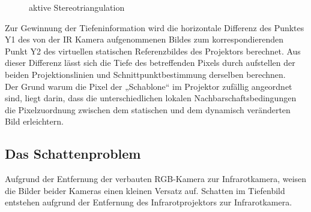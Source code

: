 \begin{figure}[!ht]
  \centering
   \caption{ aktive Stereotriangulation }
\end{figure}
Zur Gewinnung der Tiefeninformation wird die horizontale Differenz des Punktes Y1 des von der IR Kamera aufgenommenen Bildes zum korrespondierenden Punkt Y2 des virtuellen statischen Referenzbildes des Projektors berechnet. Aus dieser Differenz lässt sich die Tiefe des betreffenden Pixels durch aufstellen der beiden Projektionslinien und Schnittpunktbestimmung derselben berechnen. \\
Der Grund warum die Pixel der „Schablone“ im Projektor zufällig angeordnet sind, liegt darin, dass die unterschiedlichen lokalen Nachbarschaftsbedingungen die Pixelzuordnung zwischen dem statischen und dem dynamisch veränderten Bild erleichtern.


\subsection{Das Schattenproblem}

Aufgrund der Entfernung der verbauten RGB-Kamera zur Infrarotkamera, weisen die Bilder beider Kameras einen kleinen Versatz auf.
Schatten im Tiefenbild entstehen aufgrund der Entfernung des Infrarotprojektors zur Infrarotkamera.


